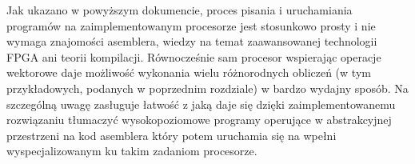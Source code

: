Jak ukazano w powyższym dokumencie, proces pisania i uruchamiania programów na zaimplementowanym procesorze jest stosunkowo prosty i nie wymaga znajomości asemblera, wiedzy na temat zaawansowanej technologii FPGA ani teorii kompilacji. Równocześnie sam procesor wspierając operacje wektorowe daje możliwość wykonania wielu różnorodnych obliczeń (w tym przykładowych, podanych w poprzednim rozdziale) w bardzo wydajny sposób. Na szczególną uwagę zasługuje łatwość z jaką daje się dzięki zaimplementowanemu rozwiązaniu tłumaczyć wysokopoziomowe programy operujące w abstrakcyjnej przestrzeni na kod asemblera który potem uruchamia się na wpełni wyspecjalizowanym ku takim zadaniom procesorze. 